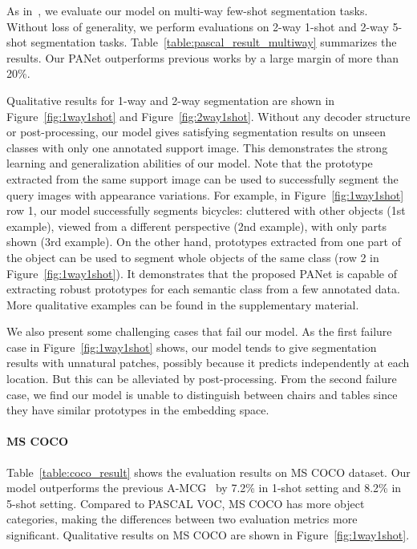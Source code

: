 \documentclass[10pt,twocolumn,letterpaper]{article}
\begin{document}
As in~\cite{dong2018few, zhang2018sg}, we evaluate our model on multi-way few-shot segmentation tasks. Without loss of  generality, we perform evaluations on 2-way 1-shot and 2-way 5-shot segmentation tasks. Table~\ref{table:pascal_result_multiway} summarizes the results. Our PANet outperforms previous works by a large margin of more than 20\%.

Qualitative results for 1-way and 2-way segmentation are shown in Figure~\ref{fig:1way1shot} and Figure~\ref{fig:2way1shot}. Without any decoder structure or post-processing, our model gives satisfying segmentation results on unseen classes with only one annotated support image. This demonstrates the strong learning  and generalization abilities of our model. Note that the prototype extracted from the same support image can be used to successfully segment the query images with appearance variations. For example, in Figure~\ref{fig:1way1shot} row 1, our model successfully segments bicycles: cluttered with other objects (1st example), viewed from a different perspective (2nd example), with only parts shown (3rd example). On the other hand, prototypes extracted from one part of the object can be used to segment whole objects of the same class (row 2 in Figure~\ref{fig:1way1shot}). It demonstrates that the proposed PANet is capable of extracting robust prototypes for each semantic class from a few annotated data. More qualitative examples can be found in the supplementary material.

We also present some challenging cases that fail our model. As the first failure case in Figure~\ref{fig:1way1shot} shows, our model tends to give segmentation results with unnatural patches, possibly because it predicts independently at each location. But this can be alleviated by post-processing. From the second failure case, we find our model is unable to distinguish between chairs and tables since they have similar prototypes in the embedding space.

\vspace{-10pt}
 \paragraph{MS COCO} Table~\ref{table:coco_result} shows the evaluation results on MS COCO dataset. Our model outperforms the previous A-MCG~\cite{Hu2018AttentionbasedMG}  by 7.2\% in 1-shot setting and 8.2\% in 5-shot setting. Compared to PASCAL VOC, MS COCO has more object categories, making the differences between two evaluation metrics more significant. Qualitative results on MS COCO are shown in Figure~\ref{fig:1way1shot}.
\end{document}
